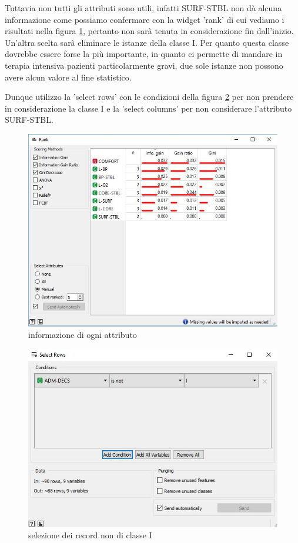\documentclass[a4paper, 12p]{report}
\begin{document}
Tuttavia non tutti gli attributi sono utili, infatti SURF-STBL non dà alcuna informazione come possiamo confermare con la widget 'rank' di cui vediamo i risultati nella figura \ref{fig:1}, pertanto non sarà tenuta in considerazione fin dall'inizio.
Un'altra scelta sarà eliminare le istanze della classe I. Per quanto questa classe dovrebbe essere forse la più importante, in quanto ci permette di mandare in terapia intensiva pazienti particolarmente gravi, due sole istanze non possono avere alcun valore al fine statistico. 

Dunque utilizzo la 'select rows' con le condizioni della figura \ref{fig:2} per non prendere in considerazione la classe I e la 'select columns' per non considerare l'attributo SURF-STBL.
\begin{figure}	
	\centering
	\includegraphics[scale = 0.5]{img/rank.JPG}
	\caption{informazione di ogni attributo }\label{fig:1}
\end{figure}
\begin{figure}
	\centering
	\includegraphics[scale = 0.4]{img/rows.JPG}
	\caption{selezione dei record non di classe I}	\label{fig:2}
\end{figure}	
\end{document}
